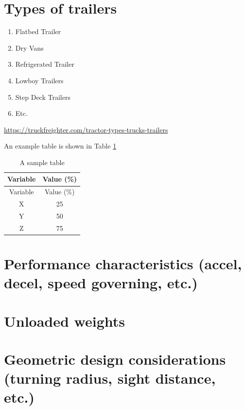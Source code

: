 \documentclass[
]{book}
\providecommand{\tightlist}{%
  \setlength{\itemsep}{0pt}\setlength{\parskip}{0pt}}
\begin{document}
\hypertarget{types-of-trailers}{%
\section{Types of trailers}\label{types-of-trailers}}

\begin{enumerate}
\def\labelenumi{\arabic{enumi}.}
\tightlist
\item
  Flatbed Trailer
\item
  Dry Vans
\item
  Refrigerated Trailer
\item
  Lowboy Trailers
\item
  Step Deck Trailers
\item
  Etc.
\end{enumerate}

\url{https://truckfreighter.com/tractor-types-trucks-trailers}

An example table is shown in Table \ref{tab:Example}

\begin{longtable}[]{@{}cc@{}}
\caption{\label{tab:Example} A sample table}\tabularnewline
\toprule()
Variable & Value (\%) \\
\midrule()
\endfirsthead
\toprule()
Variable & Value (\%) \\
\midrule()
\endhead
X & 25 \\
Y & 50 \\
Z & 75 \\
\bottomrule()
\end{longtable}

\hypertarget{performance-characteristics-accel-decel-speed-governing-etc.}{%
\section{Performance characteristics (accel, decel, speed governing, etc.)}\label{performance-characteristics-accel-decel-speed-governing-etc.}}

\hypertarget{unloaded-weights}{%
\section{Unloaded weights}\label{unloaded-weights}}

\hypertarget{geometric-design-considerations-turning-radius-sight-distance-etc.}{%
\section{Geometric design considerations (turning radius, sight distance, etc.)}\label{geometric-design-considerations-turning-radius-sight-distance-etc.}}
\end{document}
